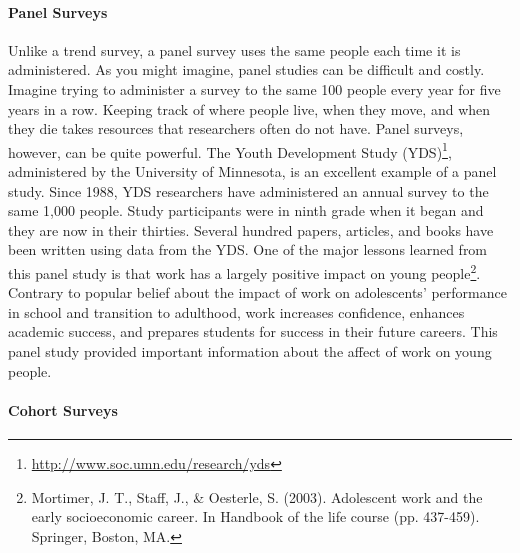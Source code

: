 \paragraph{Panel Surveys}

Unlike a trend survey, a panel survey uses the same people each time it is administered. As you might imagine, panel studies can be difficult and costly. Imagine trying to administer a survey to the same 100 people every year for five years in a row. Keeping track of where people live, when they move, and when they die takes resources that researchers often do not have. Panel surveys, however, can be quite powerful. The Youth Development Study (YDS)\footnote{\url{http://www.soc.umn.edu/research/yds}}, administered by the University of Minnesota, is an excellent example of a panel study. Since 1988, YDS researchers have administered an annual survey to the same 1,000 people. Study participants were in ninth grade when it began and they are now in their thirties. Several hundred papers, articles, and books have been written using data from the YDS. One of the major lessons learned from this panel study is that work has a largely positive impact on young people\footnote{Mortimer, J. T., Staff, J., \& Oesterle, S. (2003). Adolescent work and the early socioeconomic career. In Handbook of the life course (pp. 437-459). Springer, Boston, MA.}. Contrary to popular belief about the impact of work on adolescents' performance in school and transition to adulthood, work increases confidence, enhances academic success, and prepares students for success in their future careers. This panel study provided important information about the affect of work on young people.

\paragraph{Cohort Surveys}

